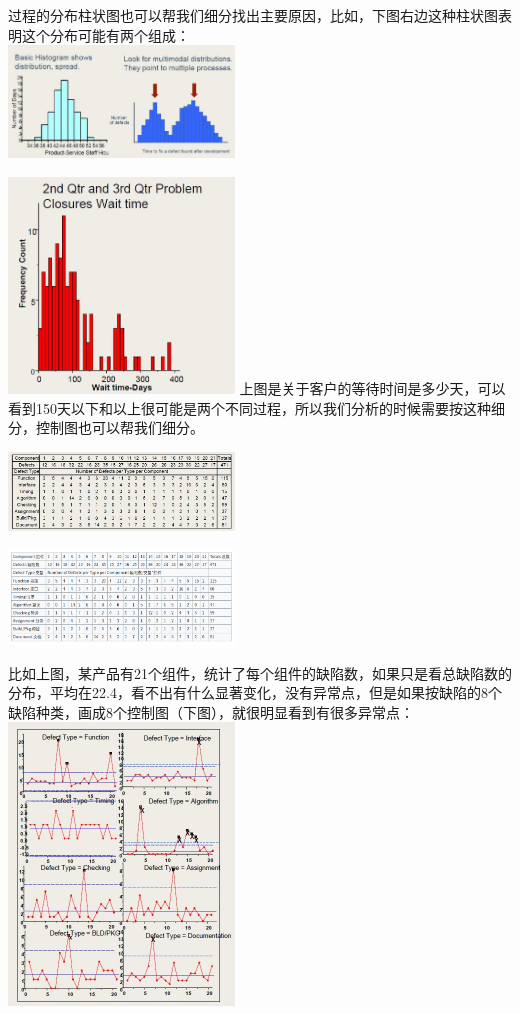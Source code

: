过程的分布柱状图也可以帮我们细分找出主要原因，比如，下图右边这种柱状图表明这个分布可能有两个组成：\\

\includegraphics[width=6cm]{DAD_p55.jpg}


\includegraphics[width=6cm]{DAD_p591.jpg}
上图是关于客户的等待时间是多少天，可以看到150天以下和以上很可能是两个不同过程，所以我们分析的时候需要按这种细分，控制图也可以帮我们细分。


\includegraphics[width=6cm]{DAD_p65.jpg}


\includegraphics[width=6cm]{Screenshotfrom2022-12-2821-23-27.png}

比如上图，某产品有21个组件，统计了每个组件的缺陷数，如果只是看总缺陷数的分布，平均在22.4，看不出有什么显著变化，没有异常点，但是如果按缺陷的8个缺陷种类，画成8个控制图（下图），就很明显看到有很多异常点：\\

\includegraphics[width=6cm]{DAD_p67.jpg}




